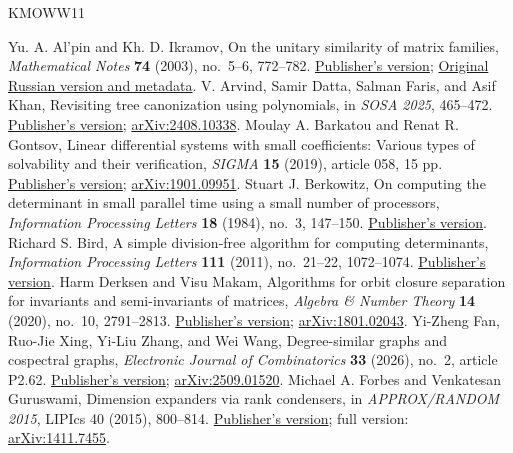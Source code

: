 \documentclass[11pt,letterpaper]{article}
\theoremstyle{definition}\newtheorem{definition}[theorem]{Definition}
\theoremstyle{remark}\newtheorem{remark}[theorem]{Remark}
\begin{document}
\begin{thebibliography}{KMOWW11}
\raggedright
\setlength{\itemsep}{3pt}
 Yu. A. Al'pin and Kh. D. Ikramov, On the unitary similarity of matrix families, \emph{Mathematical Notes} \textbf{74} (2003), no.~5--6, 772--782. \href{https://doi.org/10.1023/B:MATN.0000009013.89673.0a}{Publisher's version}; \href{https://www.mathnet.ru/eng/mzm310}{Original Russian version and metadata}.
 V. Arvind, Samir Datta, Salman Faris, and Asif Khan, Revisiting tree canonization using polynomials, in \emph{SOSA 2025}, 465--472. \href{https://doi.org/10.1137/1.9781611978315.34}{Publisher's version}; \href{https://arxiv.org/abs/2408.10338}{arXiv:2408.10338}.
 Moulay A. Barkatou and Renat R. Gontsov, Linear differential systems with small coefficients: Various types of solvability and their verification, \emph{SIGMA} \textbf{15} (2019), article 058, 15 pp. \href{https://doi.org/10.3842/SIGMA.2019.058}{Publisher's version}; \href{https://arxiv.org/abs/1901.09951}{arXiv:1901.09951}.
 Stuart J. Berkowitz, On computing the determinant in small parallel time using a small number of processors, \emph{Information Processing Letters} \textbf{18} (1984), no.~3, 147--150. \href{https://doi.org/10.1016/0020-0190(84)90018-8}{Publisher's version}.
 Richard S. Bird, A simple division-free algorithm for computing determinants, \emph{Information Processing Letters} \textbf{111} (2011), no.~21--22, 1072--1074. \href{https://doi.org/10.1016/j.ipl.2011.08.006}{Publisher's version}.
 Harm Derksen and Visu Makam, Algorithms for orbit closure separation for invariants and semi-invariants of matrices, \emph{Algebra \& Number Theory} \textbf{14} (2020), no.~10, 2791--2813. \href{https://doi.org/10.2140/ant.2020.14.2791}{Publisher's version}; \href{https://arxiv.org/abs/1801.02043}{arXiv:1801.02043}.
 Yi-Zheng Fan, Ruo-Jie Xing, Yi-Liu Zhang, and Wei Wang, Degree-similar graphs and cospectral graphs, \emph{Electronic Journal of Combinatorics} \textbf{33} (2026), no.~2, article P2.62. \href{https://doi.org/10.37236/14707}{Publisher's version}; \href{https://arxiv.org/abs/2509.01520}{arXiv:2509.01520}.
 Michael A. Forbes and Venkatesan Guruswami, Dimension expanders via rank condensers, in \emph{APPROX/RANDOM 2015}, LIPIcs 40 (2015), 800--814. \href{https://doi.org/10.4230/LIPIcs.APPROX-RANDOM.2015.800}{Publisher's version}; full version: \href{https://arxiv.org/abs/1411.7455}{arXiv:1411.7455}.

\end{thebibliography}
\end{document}
